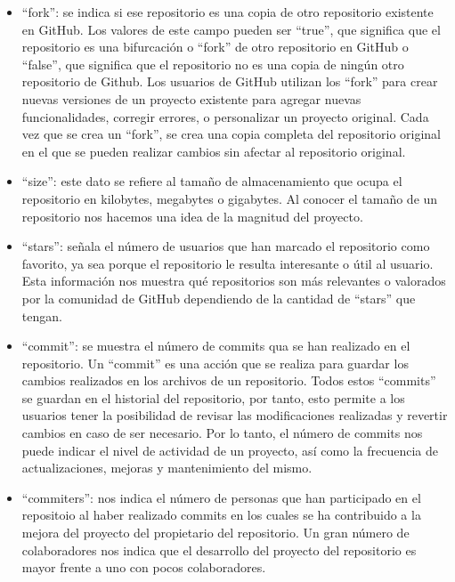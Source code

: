 \documentclass[a4paper, 12pt]{book}
\begin{document}
\begin{itemize}
  \item ``fork'': se indica si ese repositorio es una copia de otro repositorio existente en GitHub. 
  Los valores de este campo pueden ser ``true'', que significa que el repositorio es una bifurcación o ``fork'' de otro repositorio en GitHub o ``false'', que significa que el repositorio no es una copia de ningún otro repositorio de Github.
  Los usuarios de GitHub utilizan los ``fork'' para crear nuevas versiones de un proyecto existente para agregar nuevas funcionalidades, corregir errores, o personalizar un proyecto original.
  Cada vez que se crea un ``fork'', se crea una copia completa del repositorio original en el que se pueden realizar cambios sin afectar al repositorio original.
  
  \item ``size'': este dato se refiere al tamaño de almacenamiento que ocupa el repositorio en kilobytes, megabytes o gigabytes.  
  Al conocer el tamaño de un repositorio nos hacemos una idea de la magnitud del proyecto.

  \item ``stars'': señala el número de usuarios que han marcado el repositorio como favorito, ya sea porque el repositorio le resulta interesante o útil al usuario.
  Esta información nos muestra qué repositorios son más relevantes o valorados por la comunidad de GitHub dependiendo de la cantidad de ``stars'' que tengan.

  \item ``commit'': se muestra el número de commits qua se han realizado en el repositorio.
  Un ``commit'' es una acción que se realiza para guardar los cambios realizados en los archivos de un repositorio.
  Todos estos ``commits'' se guardan en el historial del repositorio, por tanto, esto permite a los usuarios tener la posibilidad de revisar las modificaciones realizadas y revertir cambios en caso de ser necesario. 
  Por lo tanto, el número de commits nos puede indicar el nivel de actividad de un proyecto, así como la frecuencia de actualizaciones, mejoras y mantenimiento del mismo.

  \item ``commiters'': nos indica el número de personas que han participado en el repositoio al haber realizado commits en los cuales se ha contribuido a la mejora del proyecto del propietario del repositorio.
  Un gran número de colaboradores nos indica que el desarrollo del proyecto del repositorio es mayor frente a uno con pocos colaboradores.
  
\end{itemize} 
\end{document}
